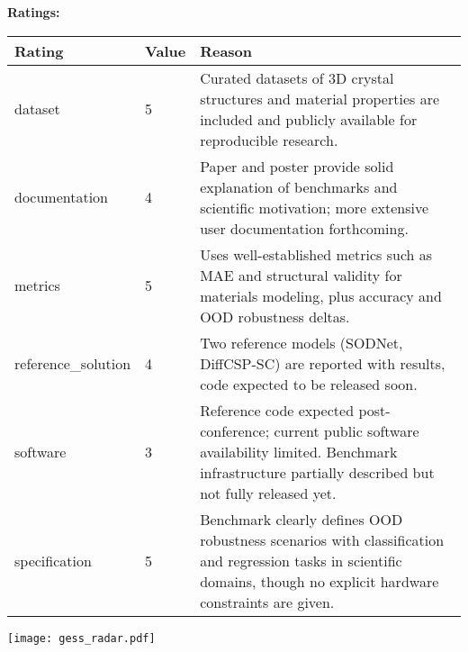 {{{\bf Ratings:} ~ \\

\begin{tabular}{p{} p{} p{}}
\hline
Rating & Value & Reason \\
\hline
dataset & 5 & Curated datasets of 3D crystal structures and material properties are included and
publicly available for reproducible research.
 \\
documentation & 4 & Paper and poster provide solid explanation of benchmarks and scientific motivation;
more extensive user documentation forthcoming.
 \\
metrics & 5 & Uses well-established metrics such as MAE and structural validity for materials modeling,
plus accuracy and OOD robustness deltas.
 \\
reference\_solution & 4 & Two reference models (SODNet, DiffCSP-SC) are reported with results, code expected
to be released soon.
 \\
software & 3 & Reference code expected post-conference; current public software availability limited.
Benchmark infrastructure partially described but not fully released yet.
 \\
specification & 5 & Benchmark clearly defines OOD robustness scenarios with classification and regression
tasks in scientific domains, though no explicit hardware constraints are given.
 \\
\hline
\end{tabular}

\texttt{[image: gess\_radar.pdf]}
}}
\clearpage
